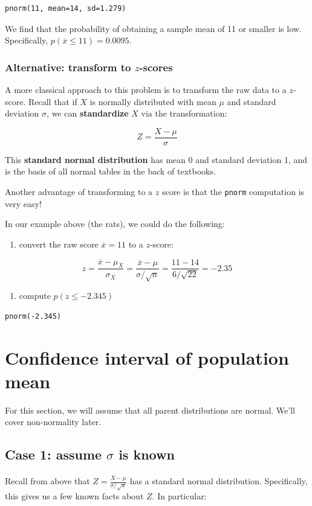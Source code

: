 \documentclass[11pt]{article}
\begin{document}
\begin{verbatim}
pnorm(11, mean=14, sd=1.279)
\end{verbatim}

We find that the probability of obtaining a sample mean of 11 or smaller is low.  Specifically, $p(\overline{x}\leq 11)=0.0095$.

\subsubsection*{Alternative: transform to $z$-scores}
\label{sec-1-2-1}
A more classical approach to this problem is to transform the raw data to a $z$-score.  Recall that if $X$ is normally distributed with mean $\mu$ and standard deviation $\sigma$, we can \textbf{standardize} $X$ via the transformation:

\[
Z=\frac{X-\mu}{\sigma}
\]

This \textbf{standard normal distribution} has mean 0 and standard deviation 1, and is the basis of all normal tables in the back of textbooks.

Another advantage of transforming to a $z$ score is that the \texttt{pnorm} computation is very easy!

In our example above (the rats), we could do the following:

\begin{enumerate}
\item convert the raw score $\overline{x}=11$ to a $z$-score:
\end{enumerate}

\[
z=\frac{\overline{x}-\mu_{\overline{X}}}{\sigma_{\overline{X}}}=\frac{\overline{x}-\mu}{\sigma/\sqrt{n}} = \frac{11-14}{6/\sqrt{22}} = -2.35
\]

\begin{enumerate}
\item compute $p(z\leq -2.345)$
\end{enumerate}

\begin{verbatim}
pnorm(-2.345)
\end{verbatim}


\section*{Confidence interval of population mean}
\label{sec-2}
For this section, we will assume that all parent distributions are normal.  We'll cover non-normality later.

\subsection*{Case 1: assume $\sigma$ is known}
\label{sec-2-1}
Recall from above that $Z=\frac{\overline{X}-\mu}{\sigma/\sqrt{x}}$ has a standard normal distribution.  Specifically, this gives us a few known facts about $Z$.  In particular:
\end{document}
